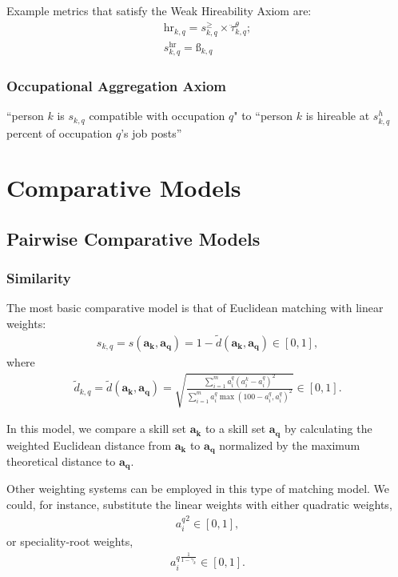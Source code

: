\documentclass{elsarticle} %
\begin{document}
Example metrics that satisfy the Weak Hireability Axiom are:
\begin{gather}
    \text{hr}_{k,q} = 
    s_{k,q}^{\geq} \times
    \ddot{\tau}_{k,q}^{\theta};\\
    s_{k,q}^{\text{hr}} = \textit{\ss}_{k,q}
\end{gather}

\subsubsection{Occupational Aggregation Axiom}
``person $k$ is $s_{k,q}$ compatible with occupation $q$" to ``person $k$ is hireable at $s_{k,q}^{h}$ percent of occupation $q$'s job posts''


\section{Comparative Models}
\subsection{Pairwise Comparative Models}
\subsubsection{Similarity}
The most basic comparative model is that of Euclidean matching with linear
weights:
\begin{gather}
    s_{k,q} =
    s(\boldsymbol{a_k}, \boldsymbol{a_q}) =
    1 - \tilde{d}(\boldsymbol{a_k}, \boldsymbol{a_q})
    \in [0,1]
    ,
\end{gather}
where
\begin{gather}
    \tilde{d}_{k,q} =
    \tilde{d}(\boldsymbol{a_k}, \boldsymbol{a_q}) =
    \sqrt{
    \frac{
    \sum_{i = 1}^{m}{
    a_{i}^{q} (a_{i}^{k} - a_{i}^{q})^2
    }
    }{
    \sum_{i = 1}^{m}{
    a_{i}^{q} \max(100 - a_{i}^{q}, a_{i}^{q})^2
    }
    }
    }
    \in [0,1]
    .
\end{gather}

In this model, we compare a skill set $\boldsymbol{a_k}$ to a skill set
$\boldsymbol{a_q}$ by calculating the weighted Euclidean distance from
$\boldsymbol{a_k}$ to $\boldsymbol{a_q}$ normalized by the maximum theoretical
distance to $\boldsymbol{a_q}$.

Other weighting systems can be employed in this type of matching model. We
could, for instance, substitute the linear weights with either quadratic
weights,
\begin{gather}
    {a_{i}^{q}} ^ 2
    \in [0,1]
    ,
\end{gather}
or speciality-root weights,
\begin{gather}
    {a_{i}^{q}} ^ {
        \frac{1}{1 - \gamma_k}
    }
    \in [0,1]
    .
\end{gather}
\end{document}
